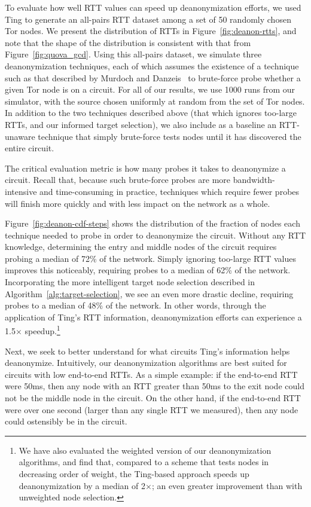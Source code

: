 To evaluate how well RTT values can speed up deanonymization efforts,
we used Ting to generate an all-pairs RTT dataset among a set of 50
randomly chosen Tor nodes.
%
We present the distribution of RTTs in Figure~\ref{fig:deanon-rtts},
and note that the shape of the distribution is consistent with that
from Figure~\ref{fig:quova_gcd}.
%
Using this all-pairs dataset, we simulate three deanonymization
techniques, each of which assumes the existence of a technique such as
that described by Murdoch and Danzeis~\cite{low-cost-traffic-analysis}
to brute-force probe whether a given Tor node is on a circuit.
%
For all of our results, we use 1000 runs from our simulator,
with the source chosen uniformly at random from the set of Tor nodes.
%
In addition to the two techniques described above (that which ignores
too-large RTTs, and our informed target selection), we also include as
a baseline an RTT-unaware technique that simply brute-force tests nodes
until it has discovered the entire circuit.


The critical evaluation metric is how many probes it takes to
deanonymize a circuit.
%
Recall that, because such brute-force probes are more
bandwidth-intensive and time-consuming in practice, techniques which
require fewer probes will finish more quickly and with less impact on
the network as a whole.


Figure~\ref{fig:deanon-cdf-steps} shows the distribution of the
fraction of nodes each technique needed to probe in order to
deanonymize the circuit.
%
Without any RTT knowledge, determining the entry and middle nodes of
the circuit requires probing a median of 72\% of the network.
%
Simply ignoring too-large RTT values improves this noticeably,
requiring probes to a median of 62\% of the network.
%
Incorporating the more intelligent target node selection described in
Algorithm~\ref{alg:target-selection}, we see an even more drastic
decline, requiring probes to a median of 48\% of the network.
%
In other words, through the application of Ting's RTT information,
deanonymization efforts can experience a 1.5$\times$ speedup.\footnote{We
have also evaluated the weighted version of our
deanonymization algorithms, and find that, compared to a scheme that
tests nodes in decreasing order of weight, the Ting-based approach
speeds up deanonymization by a median of 2$\times$; an even greater
improvement than with unweighted node selection.}




Next, we seek to better understand for what circuits Ting's information
helps deanonymize.
%
Intuitively, our deanonymization algorithms are best suited for
circuits with low end-to-end RTTs.
%
As a simple example: if the end-to-end RTT were 50ms, then any node
with an RTT greater than 50ms to the exit node could not be the middle
node in the circuit.
%
On the other hand, if the end-to-end RTT were over one second (larger
than any single RTT we measured), then any node could ostensibly be in
the circuit.


